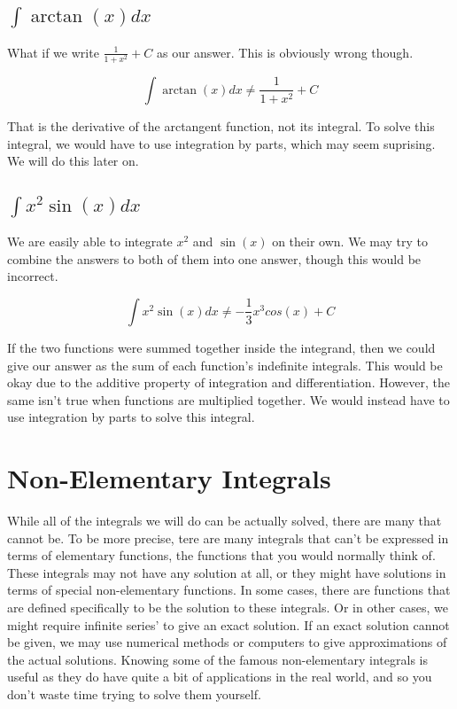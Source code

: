 \documentclass[12pt]{article}
\begin{document}
\subsection{$\int \arctan(x) dx$}

What if we write $\frac{1}{1+x^2}+C$ as our answer. This is obviously wrong though.

$$
    \int \arctan(x) dx \neq \frac{1}{1+x^2}+C
$$

That is the derivative of the arctangent function, not its integral.
To solve this integral, we would have to use integration by parts, which may seem suprising.
We will do this later on.

\subsection{$\int x^2 \sin(x) dx$}

We are easily able to integrate $x^2$ and $\sin(x)$ on their own. We may try to combine the answers to both of them into one answer, though this would be incorrect.

$$
    \int x^2\sin(x) dx \neq -\frac{1}{3}x^3cos(x) + C
$$

If the two functions were summed together inside the integrand, then we could give our answer as the sum of each function's indefinite integrals.
This would be okay due to the additive property of integration and differentiation.
However, the same isn't true when functions are multiplied together.
We would instead have to use integration by parts to solve this integral.

\section*{Non-Elementary Integrals}

While all of the integrals we will do can be actually solved, there are many that cannot be.
To be more precise, tere are many integrals that can't be expressed in terms of elementary functions, the functions that you would normally think of.
These integrals may not have any solution at all, or they might have solutions in terms of special non-elementary functions.
In some cases, there are functions that are defined specifically to be the solution to these integrals.
Or in other cases, we might require infinite series' to give an exact solution.
If an exact solution cannot be given, we may use numerical methods or computers to give approximations of the actual solutions.
Knowing some of the famous non-elementary integrals is useful as they do have quite a bit of applications in the real world, and so you don't waste time trying to solve them yourself.
\end{document}
